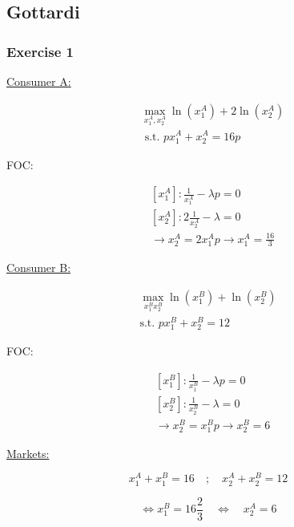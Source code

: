 {
\subsection*{Gottardi}

{
\subsubsection*{Exercise 1}

\begin{enumerate}[label=(\roman*)]
{\item 
\underline{Consumer A:}

$$
\begin{aligned}
& \max _{x_{1}^{A}, x_{2}^{A}} \ln \left(x_{1}^{A}\right)+2 \ln \left(x_{2}^{A}\right) \\
& \text { s.t. } p x_{1}^{A}+x_{2}^{A}=16 p
\end{aligned}
$$

FOC:

$$
\begin{aligned}
    & \left[x_{1}^{A}\right]: \frac{1}{x_{1}^{A}}-\lambda p=0 \\
    & {\left[x_{2}^{A}\right]: 2 \frac{1}{x_{2}^{A}}-\lambda=0} \\
    & \longrightarrow x_{2}^{A}=2 x_{1}^{A} p\longrightarrow x_{1}^{A}=\frac{16}{3}
\end{aligned}
$$

\underline{Consumer B:}

\begin{align*}
    \max _{x_{1}^{B} x_{2}^{B}} \ln \left(x_{1}^{B}\right)+\ln \left(x_{2}^{B}\right) \\
    \text{s.t. } p x_{1}^{B}+x_{2}^{B}=12
\end{align*}

FOC: 

\begin{align*}
    & \left[x_{1}^{B}\right]: \frac{1}{x_{1}^{B}}-\lambda p=0 \\
    & \left[x_{2}^{B}\right]: \frac{1}{x_{2}^{B}}-\lambda=0 \\
    & \longrightarrow x_{2}^{B}=x_{1}^{B} p \longrightarrow x_{2}^{B}=6
\end{align*}

\underline{Markets:}

$$
x_{1}^{A}+x_{1}^{B}=16 \quad ; \quad x_{2}^{A}+x_{2}^{B}=12
$$

$$
\Leftrightarrow x_{1}^{B}=16\frac{2}{3} \quad \Leftrightarrow \quad x_{2}^{A}=6
$$

}
\end{enumerate}}}
